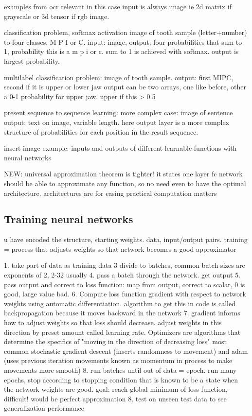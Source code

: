 \documentclass{article}
\begin{document}
examples from ocr relevant in this case
input is always image ie 2d matrix if grayscale or 3d tensor if rgb image.

classification problem, softmax activation
image of tooth sample (letter+number) to four classes, M P I or C.
input: image, output: four probabilities that sum to 1, probability this is a m
p i or c. sum to 1 is achieved with softmax. output is largest probability.

multilabel classification problem:
image of tooth sample. output: first MIPC, second if it is upper or lower jaw
output can be two arrays, one like before, other a 0-1 probability for upper jaw. upper if this > 0.5 

present sequence to sequence learning:
more complex case: image of sentence
output: text on image, variable length. here output layer is a more complex 
structure of probabilities for each position in the result sequence.

insert image example: inputs and outputs of different learnable functions with neural networks

NEW: universal approximation theorem is tighter! it states one layer fc network should be 
able to approximate any function, so no need even to have the optimal architecture.
architectures are for easing practical computation matters

\subsection{Training neural networks}

u have encoded the structure, starting weights. data, input/output pairs.
training = process that adjusts weights so that network becomes a good 
approximator

1. take part of data as training data
3 divide to batches, common batch sizes are exponents of 2, 2-32 usually 
4. pass a batch through the network. get output 
5. pass output and correct to loss function: map from output, correct to scalar,
0 is good, large value bad.
6. Compute loss function gradient with respect to network weights using automatic differentiation.
algorithm to get this in code is called backpropagation because it moves backward in the network
7. gradient informs how to adjust weights so that loss should decrease. 
adjust weights in this direction by preset amount called learning rate. Optimizers
are algorithms that determine the specifics of "moving in the direction of decreasing loss"
most common stochastic gradient descent (inserts randomness to movement) and 
adam (uses previous iteration movements known as momentum in process to make movements more smooth)
8. run  batches until out of data  = epoch. run many epochs, stop according to 
stopping condition that is known to be a state when the network weights are good.
goal: reach global minimum of loss function, difficult! would be perfect approximation
8. test on unseen test data to see generalization performance
\end{document}

